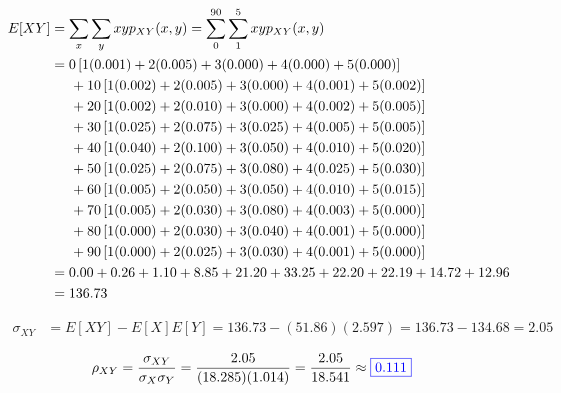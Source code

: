 \documentclass[12pt]{report}
\begin{document}
\begin{enumerate}
    \begin{align*}
      E[XY] &= \sum_x \sum_y xy p_{XY}(x, y) = \sum_0^{90} \sum_1^5 xy p_{XY}(x, y) \\
      &= 0\left[ 1(0.001) + 2(0.005) + 3(0.000) + 4(0.000) + 5(0.000) \right] \\
      &\hspace*{0.5cm}+ 10\left[ 1(0.002) + 2(0.005) + 3(0.000) + 4(0.001) + 5(0.002) \right] \\
      &\hspace*{0.5cm}+ 20\left[ 1(0.002) + 2(0.010) + 3(0.000) + 4(0.002) + 5(0.005) \right] \\
      &\hspace*{0.5cm}+ 30\left[ 1(0.025) + 2(0.075) + 3(0.025) + 4(0.005) + 5(0.005) \right] \\
      &\hspace*{0.5cm}+ 40\left[ 1(0.040) + 2(0.100) + 3(0.050) + 4(0.010) + 5(0.020) \right] \\
      &\hspace*{0.5cm}+ 50\left[ 1(0.025) + 2(0.075) + 3(0.080) + 4(0.025) + 5(0.030) \right] \\
      &\hspace*{0.5cm}+ 60\left[ 1(0.005) + 2(0.050) + 3(0.050) + 4(0.010) + 5(0.015) \right] \\
      &\hspace*{0.5cm}+ 70\left[ 1(0.005) + 2(0.030) + 3(0.080) + 4(0.003) + 5(0.000) \right] \\
      &\hspace*{0.5cm}+ 80\left[ 1(0.000) + 2(0.030) + 3(0.040) + 4(0.001) + 5(0.000) \right] \\
      &\hspace*{0.5cm}+ 90\left[ 1(0.000) + 2(0.025) + 3(0.030) + 4(0.001) + 5(0.000) \right] \\
      &= 0.00 + 0.26 + 1.10 + 8.85 + 21.20 + 33.25 + 22.20 + 22.19 + 14.72 + 12.96 \\
      &= 136.73
    \end{align*}

    \begin{align*}
      \sigma_{XY} &= E[XY] - E[X]E[Y] = 136.73 - (51.86)(2.597) = 136.73 - 134.68 = 2.05
    \end{align*}

    \begin{align*}
      \rho_{XY} &= \frac{\sigma_{XY}}{\sigma_X \sigma_Y} = \frac{2.05}{(18.285)(1.014)} = \frac{2.05}{18.541} \approx {\color{blue}\boxed{0.111}}
    \end{align*}


\end{enumerate}
\end{document}

